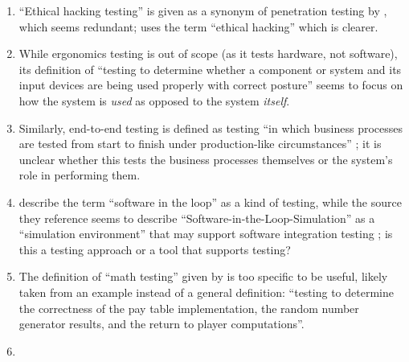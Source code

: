 \begin{enumerate}
    \item %
          ``Ethical hacking testing'' is given as a synonym of penetration
          testing by \citet[p.~13-4]{SWEBOK2024}, which seems redundant;
          \citet[p.~28]{Gerrard2000b} uses the term ``ethical hacking'' which
          is clearer.
    \item %
          While ergonomics testing is out of scope (as it tests hardware, not
          software), its definition of ``testing to determine whether a
          component or system and its input devices are being used properly
          with correct posture'' \citepISTQB{} seems to focus on how the
          system is \emph{used} as opposed to the system \emph{itself}.
    \item %
          Similarly, end-to-end testing is defined as testing ``in which
          business processes are tested from start to finish under
          production-like circumstances'' \citepISTQB{}; it is unclear
          whether this tests the business processes themselves or the system's
          role in performing them.
    \item %
          \citetISTQB{} describe the term ``software in the loop'' as a
          kind of testing, while the source they reference
          seems to describe
          ``Software-in-the-Loop-Simulation'' as a ``simulation environment''
          that may support software integration testing
          \citep[p.~153]{SPICE2022}; is this a testing approach or a tool
          that supports testing?
    \item %
          The definition of ``math testing'' given by \citetISTQB{} is
          too specific to be useful, likely taken from an example instead of
          a general definition: ``testing to determine the correctness of the
          pay table implementation, the random number generator results, and
          the return to player computations''.
    \item %

\end{enumerate}
